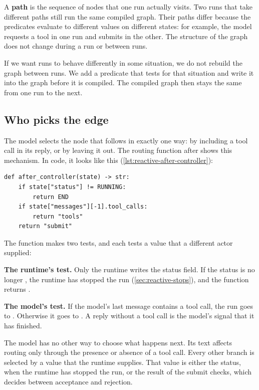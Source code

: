 A \textbf{path} is the sequence of nodes that one run actually visits. Two runs that take different
paths still run the same compiled graph. Their paths differ because the predicates evaluate to
different values on different states: for example, the model requests a tool in one run and submits
in the other. The structure of the graph does not change during a run or between runs.

If we want runs to behave differently in some situation, we do not rebuild the graph between runs.
We add a predicate that tests for that situation and write it into the graph before it is compiled.
The compiled graph then stays the same from one run to the next.

\subsection{Who picks the edge}
\label{sec:reactive-edge}

The model selects the node that follows  in exactly one way: by including a tool
call in its reply, or by leaving it out. The routing function after  shows this
mechanism. In code, it looks like this (\cref{lst:reactive-after-controller}):

\begin{lstlisting}[basicstyle=\ttfamily\footnotesize, caption={Illustrative code for the routing function after the controller node.}, label=lst:reactive-after-controller]
def after_controller(state) -> str:
    if state["status"] != RUNNING:
        return END
    if state["messages"][-1].tool_calls:
        return "tools"
    return "submit"
\end{lstlisting}

The function makes two tests, and each tests a value that a different actor supplied:
\bi
\item \textbf{The runtime's test.} Only the runtime writes the status field. If the status is no
longer , the runtime has stopped the run (\cref{sec:reactive-stops}), and the
function returns .
\item \textbf{The model's test.} If the model's last message contains a tool call, the run goes to
. Otherwise it goes to . A reply without a tool call is the model's
signal that it has finished.
\ei

The model has no other way to choose what happens next. Its text affects routing only through the
presence or absence of a tool call. Every other branch is selected by a value that the runtime
supplies. That value is either the status, when the runtime has stopped the run, or the result of
the submit checks, which decides between acceptance and rejection.

